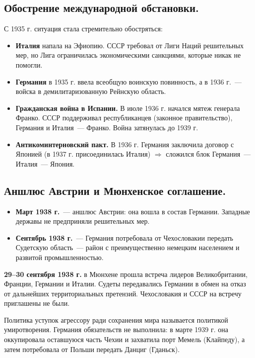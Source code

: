 \documentclass[12pt]{article}
\begin{document}
	\subsection{Обострение международной обстановки.}
	С 1935 г. ситуация стала стремительно обостряться:
	\begin{itemize}
		\item \textbf{Италия} напала на Эфиопию. СССР требовал от Лиги Наций решительных мер, но Лига ограничилась экономическими санкциями, которые никак не помогли.
		\item \textbf{Германия} в 1935 г. ввела всеобщую воинскую повинность, а в 1936 г.~--- войска в демилитаризованную Рейнскую область.
		\item \textbf{Гражданская война в Испании.} В июле 1936 г. начался мятеж генерала Франко. СССР поддерживал республиканцев (законное правительство), Германия и Италия~--- Франко. Война затянулась до 1939 г.
		\item \textbf{Антикоминтерновский пакт.} В 1936 г. Германия заключила договор с Японией (в 1937 г. присоединилась Италия) $\Rightarrow$ сложился блок Германия~--- Италия~--- Япония.
	\end{itemize}

	\subsection{Аншлюс Австрии и Мюнхенское соглашение.}
	\begin{itemize}
		\item \textbf{Март 1938 г.}~--- аншлюс Австрии: она вошла в состав Германии. Западные державы не предприняли решительных мер.
		\item \textbf{Сентябрь 1938 г.}~--- Германия потребовала от Чехословакии передать Судетскую область~--- район с преимущественно немецким населением и развитой промышленностью.
	\end{itemize}
	\begin{event}
		\textbf{29--30 сентября 1938 г.} в Мюнхене прошла встреча лидеров Великобритании, Франции, Германии и Италии. Судеты передавались Германии в обмен на отказ от дальнейших территориальных претензий. Чехословакия и СССР на встречу приглашены не были.
	\end{event}
	\begin{note}
		Политика уступок агрессору ради сохранения мира называется политикой умиротворения. Германия обязательств не выполнила: в марте 1939 г. она оккупировала оставшуюся часть Чехии и захватила порт Мемель (Клайпеду), а затем потребовала от Польши передать Данциг (Гданьск).
	\end{note}
\end{document}
